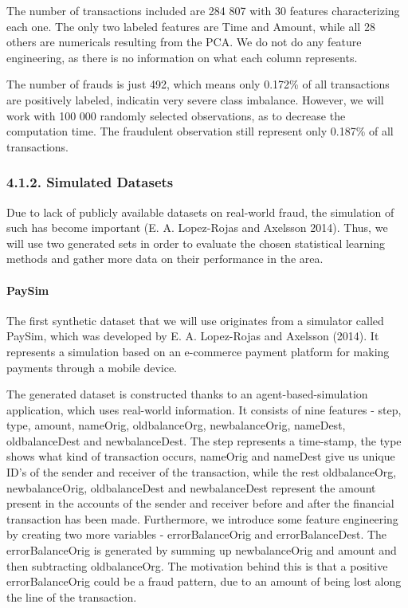 \documentclass[12pt,]{article}
\let\oldparagraph\paragraph
\renewcommand{\paragraph}[1]{\oldparagraph{#1}\mbox{}}
\begin{document}
The number of transactions included are 284 807 with 30 features
characterizing each one. The only two labeled features are Time and
Amount, while all 28 others are numericals resulting from the PCA. We do
not do any feature engineering, as there is no information on what each
column represents.

The number of frauds is just 492, which means only 0.172\% of all
transactions are positively labeled, indicatin very severe class
imbalance. However, we will work with 100 000 randomly selected
observations, as to decrease the computation time. The fraudulent
observation still represent only 0.187\% of all transactions.

\hypertarget{simulated-datasets}{%
\subsubsection{4.1.2. Simulated Datasets}\label{simulated-datasets}}

Due to lack of publicly available datasets on real-world fraud, the
simulation of such has become important (E. A. Lopez-Rojas and Axelsson
2014). Thus, we will use two generated sets in order to evaluate the
chosen statistical learning methods and gather more data on their
performance in the area.

\hypertarget{paysim}{%
\paragraph{PaySim}\label{paysim}}

The first synthetic dataset that we will use originates from a simulator
called PaySim, which was developed by E. A. Lopez-Rojas and Axelsson
(2014). It represents a simulation based on an e-commerce payment
platform for making payments through a mobile device.

The generated dataset is constructed thanks to an agent-based-simulation
application, which uses real-world information. It consists of nine
features - step, type, amount, nameOrig, oldbalanceOrg, newbalanceOrig,
nameDest, oldbalanceDest and newbalanceDest. The step represents a
time-stamp, the type shows what kind of transaction occurs, nameOrig and
nameDest give us unique ID's of the sender and receiver of the
transaction, while the rest oldbalanceOrg, newbalanceOrig,
oldbalanceDest and newbalanceDest represent the amount present in the
accounts of the sender and receiver before and after the financial
transaction has been made. Furthermore, we introduce some feature
engineering by creating two more variables - errorBalanceOrig and
errorBalanceDest. The errorBalanceOrig is generated by summing up
newbalanceOrig and amount and then subtracting oldbalanceOrg. The
motivation behind this is that a positive errorBalanceOrig could be a
fraud pattern, due to an amount of being lost along the line of the
transaction.
\end{document}
